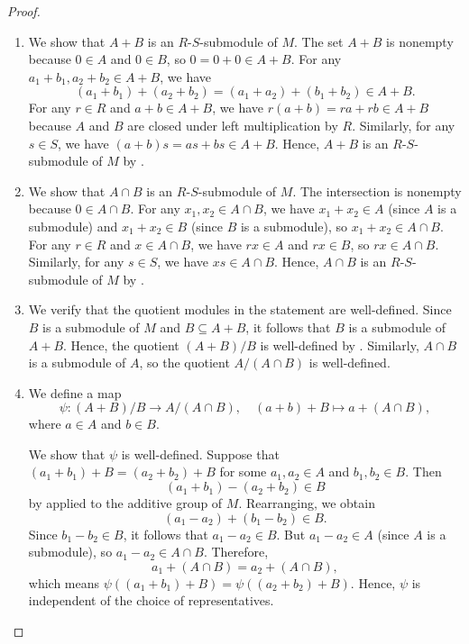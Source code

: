 \begin{proof}
    \begin{enumerate}
        \item We show that $A + B$ is an $R$-$S$-submodule of $M$. The set $A + B$ is nonempty because $0 \in A$ and $0 \in B$, so $0 = 0 + 0 \in A + B$. For any $a_1 + b_1, a_2 + b_2 \in A + B$, we have
        $$(a_1 + b_1) + (a_2 + b_2) = (a_1 + a_2) + (b_1 + b_2) \in A + B.$$
        For any $r \in R$ and $a + b \in A + B$, we have $r(a + b) = ra + rb \in A + B$ because $A$ and $B$ are closed under left multiplication by $R$. Similarly, for any $s \in S$, we have $(a + b)s = as + bs \in A + B$. Hence, $A + B$ is an $R$-$S$-submodule of $M$ by .

        \item We show that $A \cap B$ is an $R$-$S$-submodule of $M$. The intersection is nonempty because $0 \in A \cap B$. For any $x_1, x_2 \in A \cap B$, we have $x_1 + x_2 \in A$ (since $A$ is a submodule) and $x_1 + x_2 \in B$ (since $B$ is a submodule), so $x_1 + x_2 \in A \cap B$. For any $r \in R$ and $x \in A \cap B$, we have $rx \in A$ and $rx \in B$, so $rx \in A \cap B$. Similarly, for any $s \in S$, we have $xs \in A \cap B$. Hence, $A \cap B$ is an $R$-$S$-submodule of $M$ by .

        \item We verify that the quotient modules in the statement are well-defined. Since $B$ is a submodule of $M$ and $B \subseteq A + B$, it follows that $B$ is a submodule of $A + B$. Hence, the quotient $(A + B)/B$ is well-defined by . Similarly, $A \cap B$ is a submodule of $A$, so the quotient $A/(A \cap B)$ is well-defined.

        \item We define a map
        $$\psi : (A + B)/B \longrightarrow A/(A \cap B), \quad (a + b) + B \longmapsto a + (A \cap B),$$
        where $a \in A$ and $b \in B$.

        We show that $\psi$ is well-defined. Suppose that $(a_1 + b_1) + B = (a_2 + b_2) + B$ for some $a_1, a_2 \in A$ and $b_1, b_2 \in B$. Then
        $$(a_1 + b_1) - (a_2 + b_2) \in B$$
        by  applied to the additive group of $M$. Rearranging, we obtain
        $$(a_1 - a_2) + (b_1 - b_2) \in B.$$
        Since $b_1 - b_2 \in B$, it follows that $a_1 - a_2 \in B$. But $a_1 - a_2 \in A$ (since $A$ is a submodule), so $a_1 - a_2 \in A \cap B$. Therefore,
        $$a_1 + (A \cap B) = a_2 + (A \cap B),$$
        which means $\psi((a_1 + b_1) + B) = \psi((a_2 + b_2) + B)$. Hence, $\psi$ is independent of the choice of representatives.


\end{enumerate}
\end{proof}
